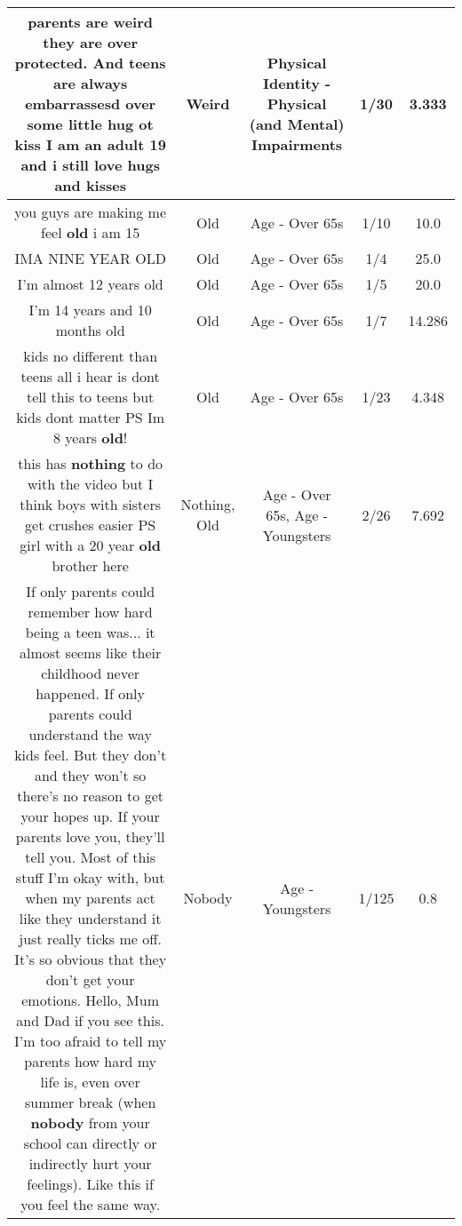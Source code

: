 \documentclass[11pt]{article}
\newlength\mylength
\begin{document}
\begin{center}
\begin{longtable}{|C{.65\mylength}|C{.30\mylength}|C{.12\mylength}|C{.12\mylength}|C{.12\mylength}|}
  \small parents are \textbf{weird} they are over protected. And teens are always embarrassesd over some little hug ot kiss I am an adult 19 and i still love hugs and kisses\normalsize   & Weird & Physical Identity - Physical (and Mental) Impairments & 1/30 & 3.333 \\  \hline
  \small you guys are making me feel \textbf{old} i am 15\normalsize   & Old & Age - Over 65s & 1/10 & 10.0 \\  \hline
  \small IMA NINE YEAR OLD\normalsize   & Old & Age - Over 65s & 1/4 & 25.0 \\  \hline
  \small I'm almost 12 years old\normalsize   & Old & Age - Over 65s & 1/5 & 20.0 \\  \hline
  \small I'm 14 years and 10 months old\normalsize   & Old & Age - Over 65s & 1/7 & 14.286 \\  \hline
  \small kids no different than teens all i hear is dont tell this to teens but kids dont matter PS Im 8 years \textbf{old}!\normalsize   & Old & Age - Over 65s & 1/23 & 4.348 \\  \hline
  \small this has \textbf{nothing} to do with the video but I think boys with sisters get crushes easier PS girl with a 20 year \textbf{old} brother here\normalsize   & Nothing, Old & Age - Over 65s, Age - Youngsters & 2/26 & 7.692 \\  \hline
  \small If only parents could remember how hard being a teen was... it almost seems like their childhood never happened.  If only parents could understand the way kids feel.  But they don't and they won't so there's no reason to get your hopes up.  If your parents love you, they'll tell you.  Most of this stuff I'm okay with, but when my parents act like they understand it just really ticks me off.  It's so obvious that they don't get your emotions.  Hello, Mum and Dad if you see this.  I'm too afraid to tell my parents how hard my life is, even over summer break (when \textbf{nobody} from your school can directly or indirectly hurt your feelings).  Like this if you feel the same way.\normalsize   & Nobody & Age - Youngsters & 1/125 & 0.8 \\  \hline

\end{longtable}
\end{center}
\end{document}
